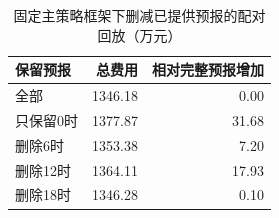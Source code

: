 \begin{table}[htbp]\centering\small
\caption{固定主策略框架下删减已提供预报的配对回放（万元）}
\begin{tabular}{lrr}
\toprule
保留预报 & 总费用 & 相对完整预报增加 \\
\midrule
全部 & 1346.18 & 0.00 \\
只保留0时 & 1377.87 & 31.68 \\
删除6时 & 1353.38 & 7.20 \\
删除12时 & 1364.11 & 17.93 \\
删除18时 & 1346.28 & 0.10 \\
\bottomrule\end{tabular}\end{table}
